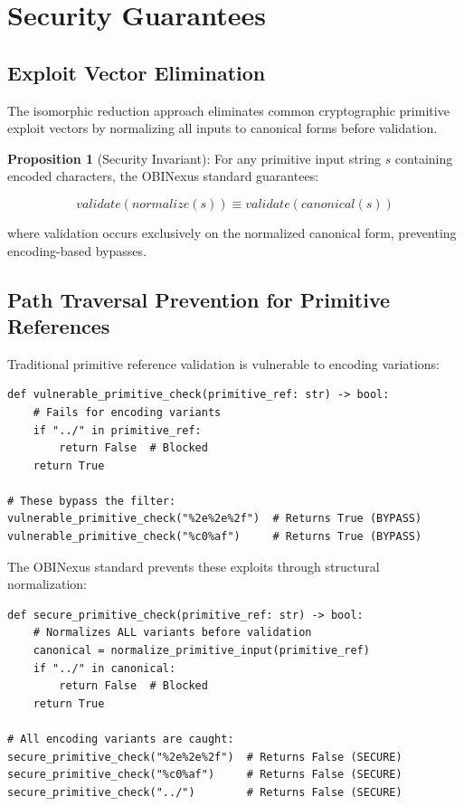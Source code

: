 \documentclass[11pt,a4paper]{article}
\begin{document}
\section{Security Guarantees}

\subsection{Exploit Vector Elimination}

The isomorphic reduction approach eliminates common cryptographic primitive exploit vectors by normalizing all inputs to canonical forms before validation.

\textbf{Proposition 1} (Security Invariant): For any primitive input string $s$ containing encoded characters, the OBINexus standard guarantees:

$$validate(normalize(s)) \equiv validate(canonical(s))$$

where validation occurs exclusively on the normalized canonical form, preventing encoding-based bypasses.

\subsection{Path Traversal Prevention for Primitive References}

Traditional primitive reference validation is vulnerable to encoding variations:

\begin{lstlisting}[caption=Vulnerable Primitive Reference Validation]
def vulnerable_primitive_check(primitive_ref: str) -> bool:
    # Fails for encoding variants
    if "../" in primitive_ref:
        return False  # Blocked
    return True

# These bypass the filter:
vulnerable_primitive_check("%2e%2e%2f")  # Returns True (BYPASS)
vulnerable_primitive_check("%c0%af")     # Returns True (BYPASS)
\end{lstlisting}

The OBINexus standard prevents these exploits through structural normalization:

\begin{lstlisting}[caption=Hardened Primitive Reference Validation]
def secure_primitive_check(primitive_ref: str) -> bool:
    # Normalizes ALL variants before validation
    canonical = normalize_primitive_input(primitive_ref)
    if "../" in canonical:
        return False  # Blocked
    return True

# All encoding variants are caught:
secure_primitive_check("%2e%2e%2f")  # Returns False (SECURE)
secure_primitive_check("%c0%af")     # Returns False (SECURE)
secure_primitive_check("../")        # Returns False (SECURE)
\end{lstlisting}
\end{document}
